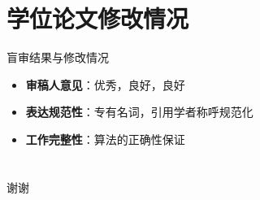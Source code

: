 \documentclass[aspectratio=1610]{ctexbeamer}
\begin{document}


\section{学位论文修改情况}
\begin{frame}{盲审结果与修改情况}
    \begin{itemize}
        \item \textbf{审稿人意见}：优秀，良好，良好
        \item \textbf{表达规范性}：专有名词，引用学者称呼规范化
        \item \textbf{工作完整性}：算法的正确性保证
    \end{itemize}
\end{frame}
\section*{}
\begin{frame}
    \centering
    \Huge 谢谢
\end{frame}
\end{document}

